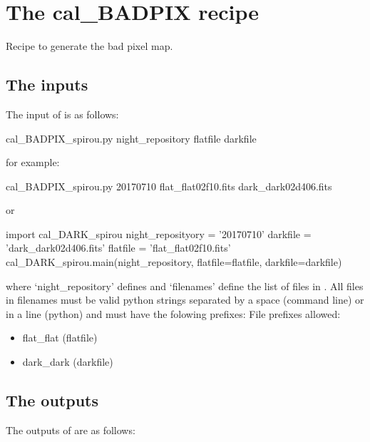 \clearpage
\newpage
\section{The cal\_BADPIX recipe}
\label{ch:the_recipes:cal_BADPIX_spirou}

Recipe to generate the bad pixel map. \\

\subsection{The inputs}
The input of \calbadpix is as follows:
\begin{cmdbox}
cal_BADPIX_spirou.py night_repository flatfile darkfile
\end{cmdbox}
\noindent for example:
\begin{cmdbox}[title={example}]
cal_BADPIX_spirou.py 20170710 flat_flat02f10.fits dark_dark02d406.fits
\end{cmdbox}
\noindent or
\begin{pythonbox}
import cal_DARK_spirou
night_reposityory = '20170710'
darkfile = 'dark_dark02d406.fits'
flatfile = 'flat_flat02f10.fits'
cal_DARK_spirou.main(night_repository, flatfile=flatfile, darkfile=darkfile)
\end{pythonbox}

\noindent where `night\_repository' defines \argnightname and `filenames' define the list of files in \argfilenames. All files in filenames must be valid python strings separated by a space (command line) or in a line (python) and must have the folowing prefixes:
\noindent File prefixes allowed:
\begin{itemize}
	\item flat\_flat (flatfile)
	\item dark\_dark (darkfile)
\end{itemize}

\subsection{The outputs}

The outputs of  are as follows:

